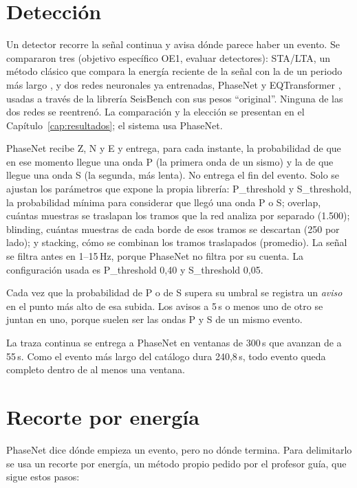 \section{Detección}
\label{sec:deteccion}

Un detector recorre la señal continua y avisa dónde parece haber un evento.
Se compararon tres (objetivo específico OE1, evaluar detectores): STA/LTA, un
método clásico que compara la energía reciente de la señal con la de un
periodo más largo \parencite{allen1978stalta}, y dos redes neuronales ya
entrenadas, PhaseNet \parencite{zhu2019phasenet} y EQTransformer
\parencite{mousavi2020eqtransformer}, usadas a través de la librería SeisBench
\parencite{woollam2022seisbench} con sus pesos ``original''. Ninguna de las
dos redes se reentrenó. La comparación y la elección se presentan en el
Capítulo~\ref{cap:resultados}; el sistema usa PhaseNet.

PhaseNet recibe Z, N y E y entrega, para cada instante, la probabilidad de que
en ese momento llegue una onda P (la primera onda de un sismo) y la de que
llegue una onda S (la segunda, más lenta). No entrega el fin del evento. Solo
se ajustan los parámetros que expone la propia librería: P\_threshold y
S\_threshold, la probabilidad mínima para considerar que llegó una onda P o S;
overlap, cuántas muestras se traslapan los tramos que la red analiza por
separado (1.500); blinding, cuántas muestras de cada borde de esos tramos se
descartan (250 por lado); y stacking, cómo se combinan los tramos traslapados
(promedio). La señal se filtra antes en 1--15\,Hz, porque PhaseNet no filtra
por su cuenta. La configuración usada es P\_threshold 0,40 y S\_threshold
0,05.

Cada vez que la probabilidad de P o de S supera su umbral se registra un
\emph{aviso} en el punto más alto de esa subida. Los avisos a 5\,s o menos
uno de otro se juntan en uno, porque suelen ser las ondas P y S de un mismo
evento.

La traza continua se entrega a PhaseNet en ventanas de 300\,s que avanzan de a
55\,s. Como el evento más largo del catálogo dura 240,8\,s, todo evento
queda completo dentro de al menos una ventana.

\section{Recorte por energía}
\label{sec:recorte}

PhaseNet dice dónde empieza un evento, pero no dónde termina. Para delimitarlo
se usa un recorte por energía, un método propio pedido por el profesor guía,
que sigue estos pasos:

